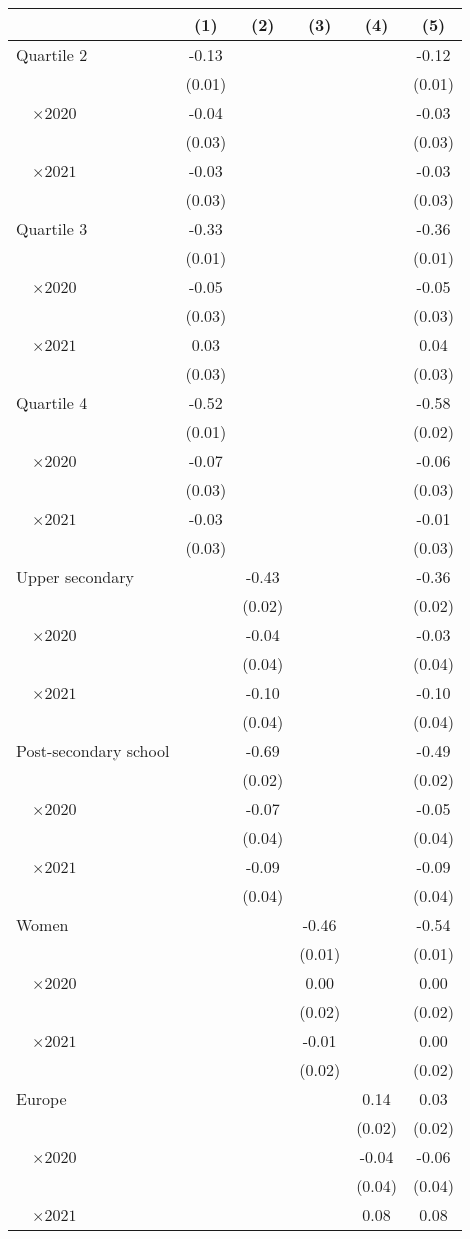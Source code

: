 
\begin{tabular}{@{}l*{5}{S[table-format={-}2.2{\tnote{***}}]}@{}}
\toprule
{} & {(1)} & {(2)} & {(3)} & {(4)} & {(5)}\tabularnewline%
\midrule
Quartile 2 & -0.13\tnote{***} &  &  &  & -0.12\tnote{***}\tabularnewline%
 & (0.01) &  &  &  & \vphantom{1} (0.01)\tabularnewline%
~~\(\times 2020\) & -0.04 &  &  &  & -0.03\tabularnewline%
 & (0.03) &  &  &  & \vphantom{5} (0.03)\tabularnewline%
~~\(\times 2021\) & -0.03 &  &  &  & -0.03\tabularnewline%
 & (0.03) &  &  &  & \vphantom{4} (0.03)\tabularnewline%
Quartile 3 & -0.33\tnote{***} &  &  &  & -0.36\tnote{***}\tabularnewline%
 & (0.01) &  &  &  & (0.01)\tabularnewline%
~~\(\times 2020\) & -0.05\tnote{\dagger} &  &  &  & -0.05\tabularnewline%
 & (0.03) &  &  &  & \vphantom{3} (0.03)\tabularnewline%
~~\(\times 2021\) & 0.03 &  &  &  & 0.04\tabularnewline%
 & (0.03) &  &  &  & \vphantom{2} (0.03)\tabularnewline%
Quartile 4 & -0.52\tnote{***} &  &  &  & -0.58\tnote{***}\tabularnewline%
 & (0.01) &  &  &  & (0.02)\tabularnewline%
~~\(\times 2020\) & -0.07\tnote{*} &  &  &  & -0.06\tnote{\dagger}\tabularnewline%
 & (0.03) &  &  &  & \vphantom{1} (0.03)\tabularnewline%
~~\(\times 2021\) & -0.03 &  &  &  & -0.01\tabularnewline%
 & (0.03) &  &  &  & (0.03)\tabularnewline%
Upper secondary &  & -0.43\tnote{***} &  &  & -0.36\tnote{***}\tabularnewline%
 &  & (0.02) &  &  & \vphantom{1} (0.02)\tabularnewline%
~~\(\times 2020\) &  & -0.04 &  &  & -0.03\tabularnewline%
 &  & (0.04) &  &  & \vphantom{3} (0.04)\tabularnewline%
~~\(\times 2021\) &  & -0.10\tnote{**} &  &  & -0.10\tnote{**}\tabularnewline%
 &  & (0.04) &  &  & \vphantom{2} (0.04)\tabularnewline%
Post-secondary school &  & -0.69\tnote{***} &  &  & -0.49\tnote{***}\tabularnewline%
 &  & (0.02) &  &  & (0.02)\tabularnewline%
~~\(\times 2020\) &  & -0.07\tnote{\dagger} &  &  & -0.05\tabularnewline%
 &  & (0.04) &  &  & \vphantom{1} (0.04)\tabularnewline%
~~\(\times 2021\) &  & -0.09\tnote{*} &  &  & -0.09\tnote{*}\tabularnewline%
 &  & (0.04) &  &  & (0.04)\tabularnewline%
Women &  &  & -0.46\tnote{***} &  & -0.54\tnote{***}\tabularnewline%
 &  &  & (0.01) &  & (0.01)\tabularnewline%
~~\(\times 2020\) &  &  & 0.00 &  & 0.00\tabularnewline%
 &  &  & (0.02) &  & \vphantom{1} (0.02)\tabularnewline%
~~\(\times 2021\) &  &  & -0.01 &  & 0.00\tabularnewline%
 &  &  & (0.02) &  & (0.02)\tabularnewline%
Europe &  &  &  & 0.14\tnote{***} & 0.03\tnote{*}\tabularnewline%
 &  &  &  & (0.02) & (0.02)\tabularnewline%
~~\(\times 2020\) &  &  &  & -0.04 & -0.06\tabularnewline%
 &  &  &  & (0.04) & \vphantom{1} (0.04)\tabularnewline%
~~\(\times 2021\) &  &  &  & 0.08\tnote{*} & 0.08\tnote{*}\tabularnewline%

\end{tabular}
